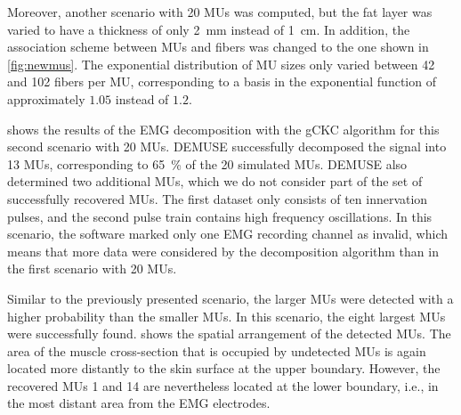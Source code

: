 Moreover, another scenario with 20 MUs was computed, but the fat layer was varied to have a thickness of only \SI{2}{\mm} instead of \SI{1}{\cm}. In addition, the association scheme between MUs and fibers was changed to the one shown in \cref{fig:newmus}. The exponential distribution of MU sizes only varied between 42 and 102 fibers per MU, corresponding to a basis in the exponential function of approximately $1.05$ instead of $1.2$.

 shows the results of the EMG decomposition with the gCKC algorithm for this second scenario with 20 MUs. DEMUSE successfully decomposed the signal into 13 MUs, corresponding to \SI{65}{\percent} of the 20 simulated MUs. DEMUSE also determined two additional MUs, which we do not consider part of the set of successfully recovered MUs. The first dataset only consists of ten innervation pulses, and the second pulse train contains high frequency oscillations.
In this scenario, the software marked only one EMG recording channel as invalid, which means that more data were considered by the decomposition algorithm than in the first scenario with 20 MUs.

Similar to the previously presented scenario, the larger MUs were detected with a higher probability than the smaller MUs. In this scenario, the eight largest MUs were successfully found. 
 shows the spatial arrangement of the detected MUs. The area of the muscle cross-section that is occupied by undetected MUs is again located more distantly to the skin surface at the upper boundary. However, the recovered MUs 1 and 14 are nevertheless located at the lower boundary, i.e., in the most distant area from the EMG electrodes. 


